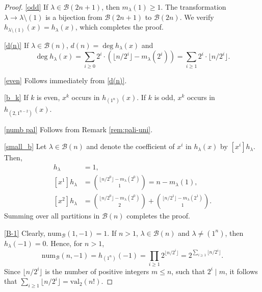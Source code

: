 \documentclass[reqno]{amsart}
\def\num{\mathrm{num}}
\def\val{\mathrm{val}}
\theoremstyle{definition}
\begin{document}
\begin{proof}
    \ref{odd} If $\lambda\in \mathcal B(2n+1)$, then $m_\lambda(1)\geq 1$. The transformation $\lambda \to \lambda\setminus (1)$ is a bijection from $\mathcal B(2n+1)$ to $\mathcal B(2n)$.  We verify    $h_{\lambda\setminus (1) }(x)= h_\lambda(x)$, which completes the proof.
  
   \ref{d(n)} If $\lambda\in\mathcal B(n)$, $d(n)=\deg h_\lambda(x)$ and  $$\deg h_\lambda(x)=\sum_{i\geq 0} 2^i\cdot(\lfloor n/2^i\rfloor-m_\lambda(2^i))=\sum_{i\geq 1} 2^i\cdot\lfloor n/2^i\rfloor.$$ 
    
 \ref{even}     Follows immediately from \ref{d(n)}.    
    
   \ref{b_k}  If $k$ is even, $x^k$ occurs in $h_{(1^n)}(x)$. If $k$ is odd, $x^k$ occurs in $h_{(2,1^{n-2})}(x)$.
  
    \ref{numb pal} Follows from Remark \ref{rem:pali-uni}. 
   
   \ref{small_b} Let $\lambda\in \mathcal B(n)$ and denote the coefficient of $x^i$  in $h_\lambda(x)$ by $[x^i]h_\lambda$. Then, \begin{align*}
        [x^0]h_\lambda & = 1,\\ [x^1]h_\lambda & = \binom{\lfloor n/2^0\rfloor -m_\lambda(2^0)}{1}=n -m_\lambda(1),\\ [x^2]h_\lambda & = \binom{\lfloor n/2^0\rfloor -m_\lambda(2^0)}{2} + \binom{\lfloor n/2^1\rfloor -m_\lambda(2^1)}{1}.
    \end{align*}
    Summing over all partitions in $\mathcal B(n)$ completes the proof.

 \ref{B-1} Clearly, $\num_{\mathcal B}(1,-1)=1$. If $n>1$, $\lambda\in \mathcal B(n)$ and  $\lambda \neq (1^n)$, then $h_\lambda(-1)=0$. Hence, for $n>1$,  $$\num_\mathcal B(n,-1)=h_{(1^n)}(-1)= \prod_{i\geq 1}2^{\lfloor n/2^i\rfloor}= 2^{\sum_{i\geq 1}\lfloor n/2^i\rfloor}.$$ Since $\lfloor n/2^i\rfloor$ is the number of positive integers $m\leq n$, such that $2^i\mid m$,  it follows that $\sum_{i\geq 1}\lfloor n/2^i\rfloor=\val_2(n!)$.


\end{proof}
\end{document}
